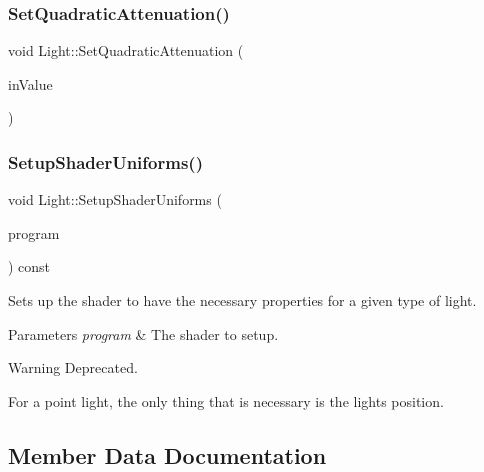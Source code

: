 \hypertarget{class_light_a413e0445d66742c666114dd74d689fc6}{}\label{class_light_a413e0445d66742c666114dd74d689fc6} 
\subsubsection{\texorpdfstring{Set\+Quadratic\+Attenuation()}{SetQuadraticAttenuation()}}
{\footnotesize\ttfamily void Light\+::\+Set\+Quadratic\+Attenuation (\begin{DoxyParamCaption}\item[{float}]{in\+Value }\end{DoxyParamCaption})}

\hypertarget{class_light_adb3750e44ae24fefa1f4c89f933b2677}{}\label{class_light_adb3750e44ae24fefa1f4c89f933b2677} 
\subsubsection{\texorpdfstring{Setup\+Shader\+Uniforms()}{SetupShaderUniforms()}}
{\footnotesize\ttfamily void Light\+::\+Setup\+Shader\+Uniforms (\begin{DoxyParamCaption}\item[{const class \hyperlink{class_shader_program}{Shader\+Program} $\ast$}]{program }\end{DoxyParamCaption}) const\hspace{0.3cm}{\ttfamily [virtual]}}



Sets up the shader to have the necessary properties for a given type of light. 


\begin{DoxyParams}{Parameters}
{\em program} & The shader to setup. \\
\hline
\end{DoxyParams}
\begin{DoxyWarning}{Warning}
Deprecated.
\end{DoxyWarning}
For a point light, the only thing that is necessary is the light\textquotesingle{}s position. 

\subsection{Member Data Documentation}
\hypertarget{class_light_afef6c00a21aa16dc6cc7a7fb1639d2fa}{}\label{class_light_afef6c00a21aa16dc6cc7a7fb1639d2fa} 
